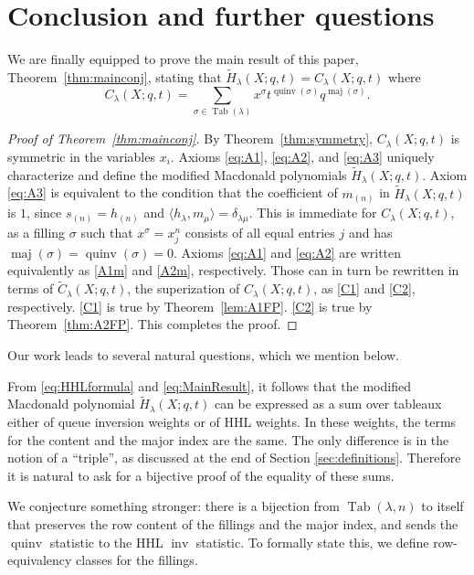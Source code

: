 \documentclass[ALCO,Unicode]{cedram}
\DeclareMathOperator{\PQT}{Tab}
\DeclareMathOperator{\maj}{maj}
\DeclareMathOperator{\inv}{inv}
\DeclareMathOperator{\quinv}{quinv}
\begin{document}
\section{Conclusion and further questions}\label{sec:conclusion}

We are finally equipped to prove the main result of this paper, Theorem~\ref{thm:mainconj}, stating that $\widetilde{H}_{\lambda}(X;q,t) = C_{\lambda}(X;q,t)$ where 
\[
C_{\lambda}(X;q,t) = \sum_{\sigma\in\PQT(\lambda)}x^{\sigma}t^{\quinv(\sigma)}q^{\maj(\sigma)}.
\]

\begin{proof}[Proof of Theorem~\ref{thm:mainconj}]
By Theorem~\ref{thm:symmetry}, $C_{\lambda}(X;q,t)$ is symmetric in the variables $x_i$. Axioms \eqref{eq:A1}, \eqref{eq:A2}, and \eqref{eq:A3} uniquely characterize and define the modified Macdonald polynomials $\widetilde{H}_{\lambda}(X;q,t)$. Axiom \eqref{eq:A3} is equivalent to the condition that the coefficient of $m_{(n)}$ in $\widetilde{H}_{\lambda}(X;q,t)$ is $1$, since $s_{(n)}=h_{(n)}$ and $\langle h_{\lambda},m_{\mu}\rangle=\delta_{\lambda\mu}$. This is immediate for $C_{\lambda}(X;q,t)$, as a filling $\sigma$ such that $x^{\sigma}=x_j^n$ consists of all equal entries $j$ and has $\maj(\sigma)=\quinv(\sigma)=0$. Axioms \eqref{eq:A1} and \eqref{eq:A2} are written equivalently as \eqref{A1m} and \eqref{A2m}, respectively. 
Those can in turn be rewritten in terms of $\widetilde{C}_{\lambda}(X;q,t)$, the superization of $C_{\lambda}(X;q,t)$, as \eqref{C1} and \eqref{C2}, respectively. \eqref{C1} is true by Theorem~\ref{lem:A1FP}. \eqref{C2} is true by Theorem~\ref{thm:A2FP}. This completes the proof. 
\end{proof}

Our work leads to several natural questions, which we mention below.

\begin{question}
From \eqref{eq:HHLformula} and \eqref{eq:MainResult}, it follows that the modified Macdonald polynomial $\widetilde{H}_\lambda(X; q, t)$ can be expressed as a sum over tableaux either of queue inversion weights or of HHL weights. 
In these weights, the terms for the content and the major index are the same. The only difference is in the notion of a ``triple'', as discussed at the end of Section \ref{sec:definitions}. Therefore it is natural to ask for a bijective proof of the equality of these sums.
\end{question}

We conjecture something stronger: there is a bijection from $\PQT(\lambda, n)$ 
to itself that preserves the row content of the fillings and the major index, and sends the $\quinv$ statistic to the HHL $\inv$ statistic. To formally state this, we define row-equivalency classes for the fillings.
\end{document}
